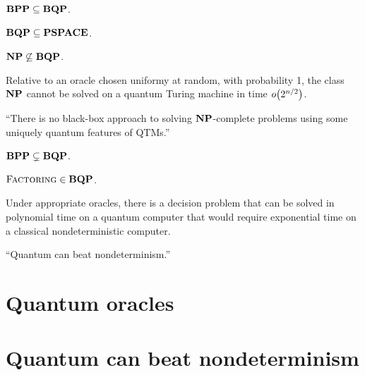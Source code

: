 \documentclass[12pt]{article}
\begin{document}
\begin{thm}
  $\mathbf{BPP} \subseteq \mathbf{BQP}$.
\end{thm}

\begin{thm}
  $\mathbf{BQP} \subseteq \mathbf{PSPACE}$.
\end{thm}

\begin{conj}
  $\mathbf{NP} \not\subseteq \mathbf{BQP}$.
\end{conj}

\begin{thm}
  Relative to an oracle chosen uniformy at random, with probability 1, the class
  $\mathbf{NP}$ cannot be solved on a quantum Turing machine in time $\smallo{2^{n/2}}$.
\end{thm}
``There is no black-box approach to solving $\mathbf{NP}$-complete problems using some
uniquely quantum features of QTMs.''

\begin{conj}
  $\mathbf{BPP} \subsetneq \mathbf{BQP}$.
\end{conj}

\begin{thm}
  $\textsc{Factoring} \in \mathbf{BQP}$.
\end{thm}

\begin{thm}[\cite{BB92}]
  Under appropriate oracles, there is a decision problem that can be solved in
  polynomial time on a quantum computer that would require exponential time on a
  classical nondeterministic computer.
\end{thm}
``Quantum can beat nondeterminism.''

\section{Quantum oracles}


\section{Quantum can beat nondeterminism \cite{BB92}}


\nocite{*}


\end{document}

